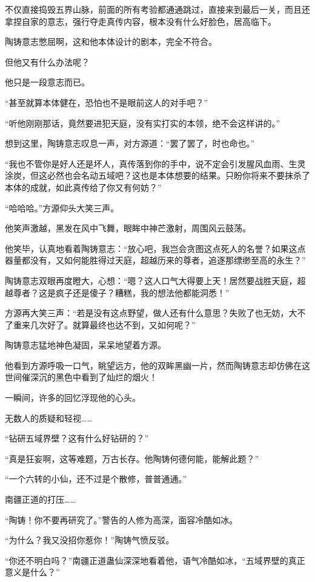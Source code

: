 \begin{this_body}
不仅直接捣毁五界山脉，前面的所有考验都通通跳过，直接来到最后一关，而且还拿捏自家的意志，强行夺走真传内容，根本没有什么好脸色，居高临下。

陶铸意志憋屈啊，这和他本体设计的剧本，完全不符合。

但他又有什么办法呢？

他只是一段意志而已。

“甚至就算本体健在，恐怕也不是眼前这人的对手吧？”

“听他刚刚那话，竟然要进犯天庭，没有实打实的本领，绝不会这样讲的。”

想到这里，陶铸意志叹息一声，对方源道：“罢了罢了，时也命也。”

“我也不管你是好人还是坏人，真传落到你的手中，说不定会引发腥风血雨、生灵涂炭，但这必然也会名动五域吧？这也是本体想要的结果。只盼你将来不要抹杀了本体的成就，如此真传给了你又有何妨？”

“哈哈哈。”方源仰头大笑三声。

他笑声激越，黑发在风中飞舞，眼眸中神芒激射，周围风云鼓荡。

他笑毕，认真地看着陶铸意志：“放心吧，我岂会贪图这点死人的名誉？如果这点器量都没有，又如何能胜得过天庭，超越历来的尊者，追逐那缥缈至高的永生？”

陶铸意志双眼再度瞪大，心想：“嗯？这人口气大得要上天！居然要战胜天庭，超越尊者？这是疯子还是傻子？糟糕，我的想法他都能洞悉！”

方源再大笑三声：“若是没有这点野望，做人还有什么意思？失败了也无妨，大不了重来几次好了。就算最终也达不到，又如何呢？”

陶铸意志猛地神色凝固，呆呆地望着方源。

他看到方源呼吸一口气，眺望远方，他的双眸黑幽一片，然而陶铸意志却仿佛在这世间催深沉的黑色中看到了灿烂的烟火！

一瞬间，许多的回忆浮现他的心头。

无数人的质疑和轻视……

“钻研五域界壁？这有什么好钻研的？”

“真是狂妄啊，这等难题，万古长存。他陶铸何德何能，能解此题？”

“一个六转的小仙，还不过是个散修，普普通通。”

南疆正道的打压……

“陶铸！你不要再研究了。”警告的人修为高深，面容冷酷如冰。

“为什么？我又没招你惹你！”陶铸气愤反驳。

“你还不明白吗？”南疆正道蛊仙深深地看着他，语气冷酷如冰，“五域界壁的真正意义是什么？”


\end{this_body}
